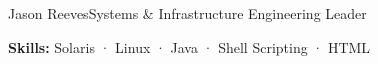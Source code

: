 \documentclass{article}
\begin{document}
\begin{cv}{Jason Reeves}{Systems \& Infrastructure Engineering Leader}
\begin{cvevent}[Nov 1995][Jan 1997]
  \textbf{Skills:} Solaris · Linux · Java · Shell Scripting · HTML
  \vspace*{5mm}
\end{cvevent}

\end{cv}
\end{document}

